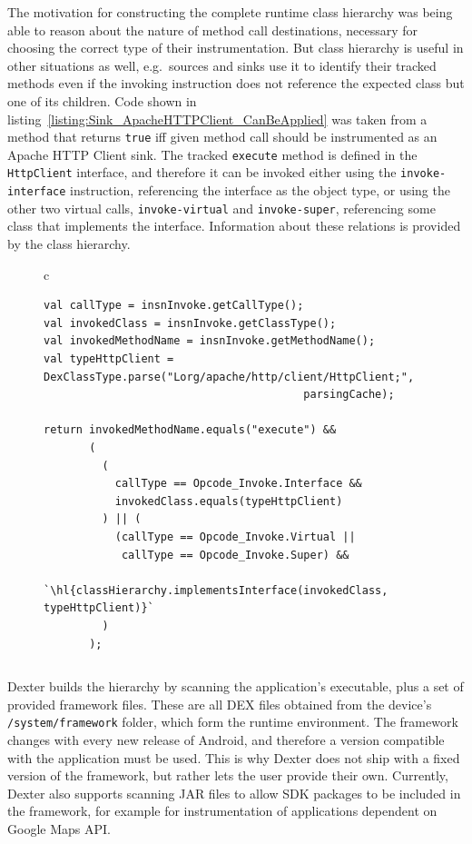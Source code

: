 \documentclass[12pt,twoside,notitlepage]{report}
\begin{document}
The motivation for constructing the complete runtime class hierarchy was being able to reason about the nature of method call destinations, necessary for choosing the correct type of their instrumentation. But class hierarchy is useful in other situations as well, e.g.\ sources and sinks use it to identify their tracked methods even if the invoking instruction does not reference the expected class but one of its children. Code shown in listing~\ref{listing:Sink_ApacheHTTPClient_CanBeApplied} was taken from a method that returns \verb$true$ iff given method call should be instrumented as an Apache HTTP Client sink. The tracked \verb$execute$ method is defined in the \verb$HttpClient$ interface, and therefore it can be invoked either using the \verb$invoke-interface$ instruction, referencing the interface as the object type, or using the other two virtual calls, \verb$invoke-virtual$ and \verb$invoke-super$, referencing some class that implements the interface. Information about these relations is provided by the class hierarchy. 

\begin{figure}
	\centering
	\begin{tabular}{c}
	\begin{lstlisting}
val callType = insnInvoke.getCallType();
val invokedClass = insnInvoke.getClassType();
val invokedMethodName = insnInvoke.getMethodName();
val typeHttpClient = DexClassType.parse("Lorg/apache/http/client/HttpClient;", 
                                        parsingCache);

return invokedMethodName.equals("execute") &&
       (
         (
           callType == Opcode_Invoke.Interface && 
           invokedClass.equals(typeHttpClient)
         ) || (
           (callType == Opcode_Invoke.Virtual || 
           	callType == Opcode_Invoke.Super) && 
           `\hl{classHierarchy.implementsInterface(invokedClass, typeHttpClient)}`
         )
       );
	\end{lstlisting}
	\end{tabular}
	\begin{lstlisting}[caption={Code that decides whether a method call given by instruction in \texttt{insnInvoke} should be instrumented as an Apache HTTP Client sink.},
	                   label={listing:Sink_ApacheHTTPClient_CanBeApplied}]
	\end{lstlisting}
\end{figure}

Dexter builds the hierarchy by scanning the application's executable, plus a set of provided framework files. These are all DEX files obtained from the device's \verb$/system/framework$ folder, which form the runtime environment. The framework changes with every new release of Android, and therefore a version compatible with the application must be used. This is why Dexter does not ship with a fixed version of the framework, but rather lets the user provide their own. Currently, Dexter also supports scanning JAR files to allow SDK packages to be included in the framework, for example for instrumentation of applications dependent on Google Maps API. 
\end{document}
